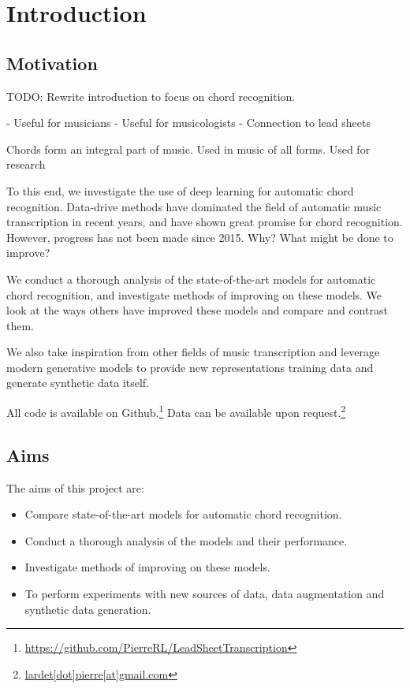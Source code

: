 \chapter{Introduction}

\section{Motivation}

TODO:
Rewrite introduction to focus on chord recognition.

- Useful for musicians
- Useful for musicologists
- Connection to lead sheets

Chords form an integral part of music. Used in music of all forms. Used for research

To this end, we investigate the use of deep learning for automatic chord recognition. Data-drive methods have dominated the field of automatic music transcription in recent years, and have shown great promise for chord recognition. However, progress has not been made since 2015. Why? What might be done to improve?

We conduct a thorough analysis of the state-of-the-art models for automatic chord recognition, and investigate methods of improving on these models. We look at the ways others have improved these models and compare and contrast them. 

We also take inspiration from other fields of music transcription and leverage modern generative models to provide new representations training data and generate synthetic data itself.

All code is available on Github.\footnote{\url{https://github.com/PierreRL/LeadSheetTranscription}} Data can be available upon request.\footnote{\url{lardet[dot]pierre[at]gmail.com}}


\section{Aims}

The aims of this project are:
\begin{itemize}
    \item Compare state-of-the-art models for automatic chord recognition.
    \item Conduct a thorough analysis of the models and their performance.
    \item Investigate methods of improving on these models.
    \item To perform experiments with new sources of data, data augmentation and synthetic data generation.
\end{itemize}

